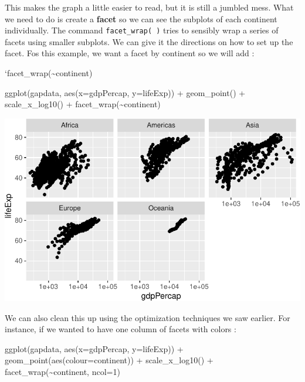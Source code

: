 \documentclass[
  letterpaper,
  DIV=11,
  numbers=noendperiod]{scrreprt}
\newenvironment{Shaded}{\begin{snugshade}}{\end{snugshade}}
\newcommand{\AttributeTok}[1]{\textcolor[rgb]{0.40,0.45,0.13}{#1}}
\newcommand{\DecValTok}[1]{\textcolor[rgb]{0.68,0.00,0.00}{#1}}
\newcommand{\FunctionTok}[1]{\textcolor[rgb]{0.28,0.35,0.67}{#1}}
\newcommand{\NormalTok}[1]{\textcolor[rgb]{0.00,0.23,0.31}{#1}}
\newcommand{\SpecialCharTok}[1]{\textcolor[rgb]{0.37,0.37,0.37}{#1}}
\begin{document}
This makes the graph a little easier to read, but it is still a jumbled
mess. What we need to do is create a \textbf{facet} so we can see the
subplots of each continent individually. The command
\texttt{facet\_wrap(\ )} tries to sensibly wrap a series of facets using
smaller subplots. We can give it the directions on how to set up the
facet. Fos this example, we want a facet by continent so we will add :

`facet\_wrap(\textasciitilde continent)

\begin{Shaded}
\begin{Highlighting}[]
 \FunctionTok{ggplot}\NormalTok{(gapdata, }\FunctionTok{aes}\NormalTok{(}\AttributeTok{x=}\NormalTok{gdpPercap, }\AttributeTok{y=}\NormalTok{lifeExp)) }\SpecialCharTok{+}
  \FunctionTok{geom\_point}\NormalTok{() }\SpecialCharTok{+}
  \FunctionTok{scale\_x\_log10}\NormalTok{() }\SpecialCharTok{+}
  \FunctionTok{facet\_wrap}\NormalTok{(}\SpecialCharTok{\textasciitilde{}}\NormalTok{continent)}
\end{Highlighting}
\end{Shaded}

\includegraphics{Advanced_Scatterplot_Techniques_files/figure-pdf/unnamed-chunk-17-1.pdf}

We can also clean this up using the optimization techniques we saw
earlier. For instance, if we wanted to have one column of facets with
colors :

\begin{Shaded}
\begin{Highlighting}[]
\FunctionTok{ggplot}\NormalTok{(gapdata, }\FunctionTok{aes}\NormalTok{(}\AttributeTok{x=}\NormalTok{gdpPercap, }\AttributeTok{y=}\NormalTok{lifeExp)) }\SpecialCharTok{+}
  \FunctionTok{geom\_point}\NormalTok{(}\FunctionTok{aes}\NormalTok{(}\AttributeTok{colour=}\NormalTok{continent)) }\SpecialCharTok{+}
  \FunctionTok{scale\_x\_log10}\NormalTok{() }\SpecialCharTok{+}
  \FunctionTok{facet\_wrap}\NormalTok{(}\SpecialCharTok{\textasciitilde{}}\NormalTok{continent, }\AttributeTok{ncol=}\DecValTok{1}\NormalTok{) }
\end{Highlighting}
\end{Shaded}
\end{document}
